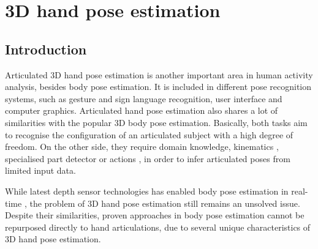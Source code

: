 \chapter{3D hand pose estimation}
\label{chap/hand}

\section{Introduction}

Articulated 3D hand pose estimation is another important area in human activity analysis, besides body pose estimation.   
It is included in different pose recognition systems, such as gesture and sign language recognition, user interface and computer graphics.
Articulated hand pose estimation also shares a lot of similarities with the popular 3D body pose estimation. Basically, both tasks aim to recognise the configuration of an articulated subject with a high degree of freedom.  
On the other side, they require domain knowledge, \eg kinematics \cite{LaGorce2011, Simo-Serra2012}, specialised part detector \cite{Bissacco2007} or actions \cite{Yao2012}, in order to infer articulated poses from limited input data. 

While latest depth sensor technologies has enabled body pose estimation in real-time \cite{Baak2011, Shotton2011, Girshick2011, Sun2012}, the problem of 3D hand pose estimation still remains an unsolved issue. Despite their similarities, proven approaches in body pose estimation cannot be repurposed directly to hand articulations, due to several unique characteristics of 3D hand pose estimation.  

